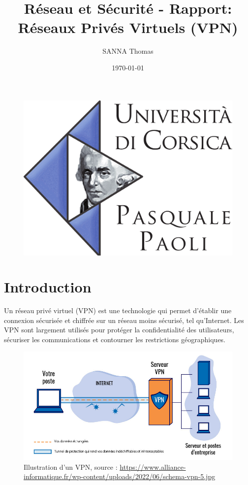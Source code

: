\documentclass{report}
\title{Réseau et Sécurité - Rapport: Réseaux Privés Virtuels (VPN)}
\author{SANNA Thomas}
\date{\today}
\begin{document}
\maketitle

\begin{figure}
  \centering
  \includegraphics[width=1\textwidth]{img/logouniv.png}
\end{figure}

\tableofcontents

\chapter{Introduction}
Un réseau privé virtuel (VPN) est une technologie qui permet d'établir une connexion sécurisée et chiffrée sur un réseau moins sécurisé, tel qu'Internet. Les VPN sont largement utilisés pour protéger la confidentialité des utilisateurs, sécuriser les communications et contourner les restrictions géographiques.

\begin{figure}[H]
  \centering
  \includegraphics[width=1\textwidth]{img/schema-vpn-5.jpg}
  \caption{Illustration d'un VPN, source : \url{https://www.alliance-informatique.fr/wp-content/uploads/2022/06/schema-vpn-5.jpg}}
\end{figure}
\end{document}
